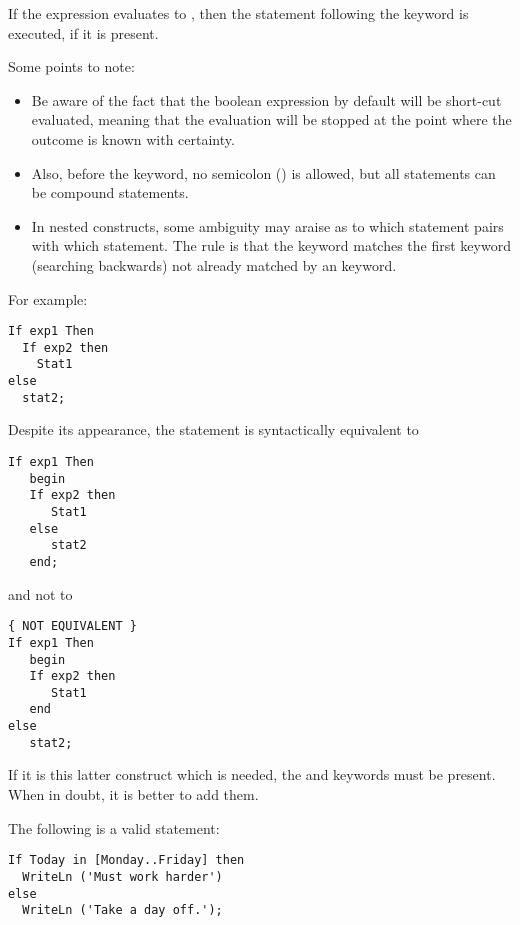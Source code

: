 If the expression evaluates to , then the statement following
the  keyword is executed, if it is present.

Some points to note:
\begin{itemize}
\item 
Be aware of the fact that the boolean expression by default will be 
short-cut evaluated, meaning that the evaluation will be stopped at 
the point where the  outcome is known with certainty.
\item
Also, before the  keyword,  no semicolon (\var{;}) is allowed,
but all statements can be compound statements.
\item
In nested  constructs, some ambiguity may araise as
to which   statement pairs with which  statement. The rule
is that the  keyword matches the first  keyword
(searching backwards) not already matched by an  keyword.
\end{itemize}
For example:
\begin{verbatim}
If exp1 Then
  If exp2 then
    Stat1
else
  stat2;
\end{verbatim}
Despite its appearance, the statement is syntactically equivalent to
\begin{verbatim}
If exp1 Then
   begin
   If exp2 then
      Stat1
   else
      stat2
   end;
\end{verbatim}
and not to
\begin{verbatim}
{ NOT EQUIVALENT }
If exp1 Then
   begin
   If exp2 then
      Stat1
   end
else
   stat2;
\end{verbatim}
If it is this latter construct which is needed, the  and 
keywords must be present. When in doubt, it is better to add them.

The following is a valid statement:
\begin{verbatim}
If Today in [Monday..Friday] then
  WriteLn ('Must work harder')
else
  WriteLn ('Take a day off.');
\end{verbatim}

